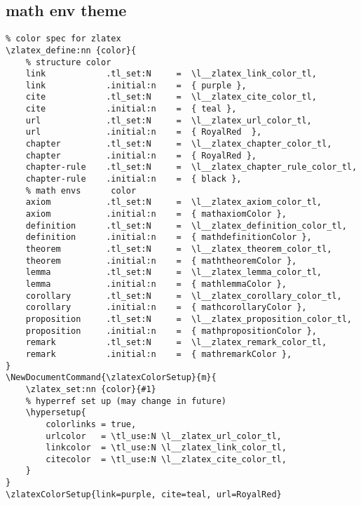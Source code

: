 \subsection{math env theme}
\begin{verbatim}
% color spec for zlatex
\zlatex_define:nn {color}{
    % structure color
    link            .tl_set:N     =  \l__zlatex_link_color_tl,
    link            .initial:n    =  { purple },
    cite            .tl_set:N     =  \l__zlatex_cite_color_tl,
    cite            .initial:n    =  { teal },
    url             .tl_set:N     =  \l__zlatex_url_color_tl,
    url             .initial:n    =  { RoyalRed  },
    chapter         .tl_set:N     =  \l__zlatex_chapter_color_tl,
    chapter         .initial:n    =  { RoyalRed },  
    chapter-rule    .tl_set:N     =  \l__zlatex_chapter_rule_color_tl,
    chapter-rule    .initial:n    =  { black },
    % math envs      color
    axiom           .tl_set:N     =  \l__zlatex_axiom_color_tl,
    axiom           .initial:n    =  { mathaxiomColor },
    definition      .tl_set:N     =  \l__zlatex_definition_color_tl,
    definition      .initial:n    =  { mathdefinitionColor },
    theorem         .tl_set:N     =  \l__zlatex_theorem_color_tl,
    theorem         .initial:n    =  { maththeoremColor },
    lemma           .tl_set:N     =  \l__zlatex_lemma_color_tl,
    lemma           .initial:n    =  { mathlemmaColor },
    corollary       .tl_set:N     =  \l__zlatex_corollary_color_tl,
    corollary       .initial:n    =  { mathcorollaryColor },
    proposition     .tl_set:N     =  \l__zlatex_proposition_color_tl,
    proposition     .initial:n    =  { mathpropositionColor },
    remark          .tl_set:N     =  \l__zlatex_remark_color_tl,
    remark          .initial:n    =  { mathremarkColor },
}
\NewDocumentCommand{\zlatexColorSetup}{m}{
    \zlatex_set:nn {color}{#1}
    % hyperref set up (may change in future)
    \hypersetup{
        colorlinks = true,
        urlcolor   = \tl_use:N \l__zlatex_url_color_tl,
        linkcolor  = \tl_use:N \l__zlatex_link_color_tl,
        citecolor  = \tl_use:N \l__zlatex_cite_color_tl,
    }
}
\zlatexColorSetup{link=purple, cite=teal, url=RoyalRed}
\end{verbatim}


